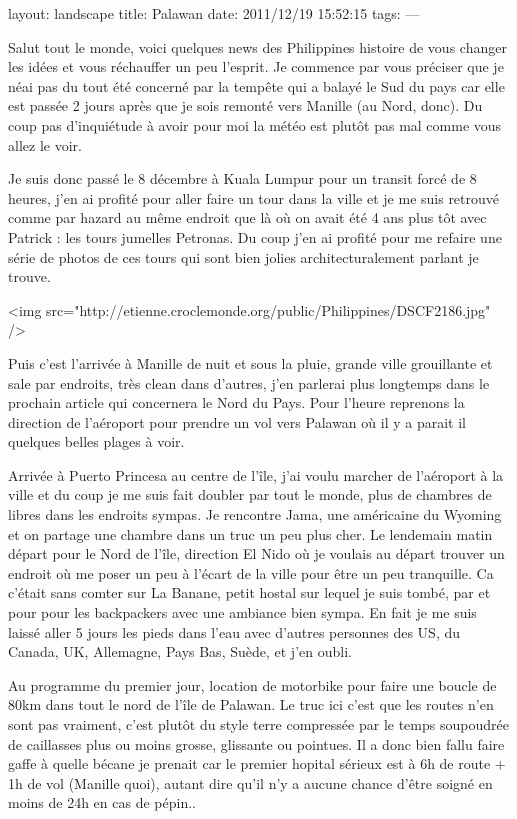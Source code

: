 layout: landscape
title: Palawan
date: 2011/12/19 15:52:15
tags:
---

Salut tout le monde, voici quelques news des Philippines histoire de vous changer les idées et vous réchauffer un peu l'esprit.
Je commence par vous préciser que je néai pas du tout été concerné par la tempête qui a balayé le Sud du pays car elle est passée 2 jours après que je sois remonté vers Manille (au Nord, donc). Du coup pas d'inquiétude à avoir pour moi la météo est plutôt pas mal comme vous allez le voir.

Je suis donc passé le 8 décembre à Kuala Lumpur pour un transit forcé de 8 heures, j'en ai profité pour aller faire un tour dans la ville et je me suis retrouvé comme par hazard au même endroit que là où on avait été 4 ans plus tôt avec Patrick : les tours jumelles Petronas. Du coup j'en ai profité pour me refaire une série de photos de ces tours qui sont bien jolies architecturalement parlant je trouve.

<img src="http://etienne.croclemonde.org/public/Philippines/DSCF2186.jpg" />

Puis c'est l'arrivée à Manille de nuit et sous la pluie, grande ville grouillante et sale par endroits, très clean dans d'autres, j'en parlerai plus longtemps dans le prochain article qui concernera le Nord du Pays. Pour l'heure reprenons la direction de l'aéroport pour prendre un vol vers Palawan où il y a parait il quelques belles plages à voir.

Arrivée à Puerto Princesa au centre de l'île, j'ai voulu marcher de l'aéroport à la ville et du coup je me suis fait doubler par tout le monde, plus de chambres de libres dans les endroits sympas. Je rencontre Jama, une américaine du Wyoming et on partage une chambre dans un truc un peu plus cher. Le lendemain matin départ pour le Nord de l'île, direction El Nido où je voulais au départ trouver un endroit où me poser un peu à l'écart de la ville pour être un peu tranquille. Ca c'était sans comter sur La Banane, petit hostal sur lequel je suis tombé, par et pour pour les backpackers avec une ambiance bien sympa. En fait je me suis laissé aller 5 jours les pieds dans l'eau avec d'autres personnes des US, du Canada, UK, Allemagne, Pays Bas, Suède, et j'en oubli.

Au programme du premier jour, location de motorbike pour faire une boucle de 80km dans tout le nord de l'île de Palawan. Le truc ici c'est que les routes n'en sont pas vraiment, c'est plutôt du style terre compressée par le temps soupoudrée de caillasses plus ou moins grosse, glissante ou pointues. Il a donc bien fallu faire gaffe à quelle bécane je prenait car le premier hopital sérieux est à 6h de route + 1h de vol (Manille quoi), autant dire qu'il n'y a aucune chance d'être soigné en moins de 24h en cas de pépin..

